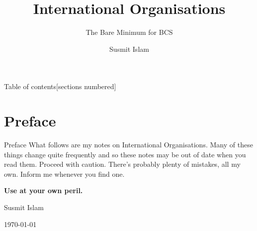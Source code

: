 \documentclass[
  10pt,
  ignorenonframetext,
  progressbar=frametitle]{beamer}
\title{International Organisations}
\subtitle{The Bare Minimum for BCS}
\author{Susmit Islam}
\date{}
\institute{Sir Salimullah Medical College}
\begin{document}
\frame{\titlepage}
\begin{frame}[t,allowframebreaks]
{Table of contents}[sections numbered]

\tableofcontents[hideallsubsections]
\end{frame}

\section{Preface}
\begin{frame}[allowframebreaks]
{Preface}
\protect\hypertarget{preface}{}
What follows are my notes on International Organisations. Many of these
things change quite frequently and so these notes may be out of date
when you read them. Proceed with caution. There's probably plenty of
mistakes, all my own. Inform me whenever you find one.\newline

\textbf{Use at your own peril.}

\hfill Susmit Islam

\hfill\today
\end{frame}
\end{document}
